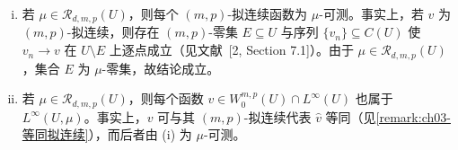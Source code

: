 \documentclass[../../main.tex]{subfiles}%
\begin{document}
\begin{remark}\label{remark:ch03-弥散测度性质}
\begin{enumerate}[(i)]
\item 若 $\mu\in\mathscr{R}_{d,m,p}(U)$，则每个 $(m,p)$-拟连续函数为 $\mu$-可测。事实上，若 $v$ 为 $(m,p)$-拟连续，则存在 $(m,p)$-零集 $E\subseteq U$ 与序列 $\{v_n\}\subseteq C(U)$ 使 $v_n\to v$ 在 $U\setminus E$ 上逐点成立（见文献~[2, Section 7.1]）。由于 $\mu\in\mathscr{R}_{d,m,p}(U)$，集合 $E$ 为 $\mu$-零集，故结论成立。
\item 若 $\mu\in\mathscr{R}_{d,m,p}(U)$，则每个函数 $v\in W^{m,p}_0(U)\cap L^\infty(U)$ 也属于 $L^\infty(U,\mu)$。事实上，$v$ 可与其 $(m,p)$-拟连续代表 $\widehat v$ 等同（见\cref{remark:ch03-等同拟连续}），而后者由 (i) 为 $\mu$-可测。
\end{enumerate}
\end{remark}
\end{document}
